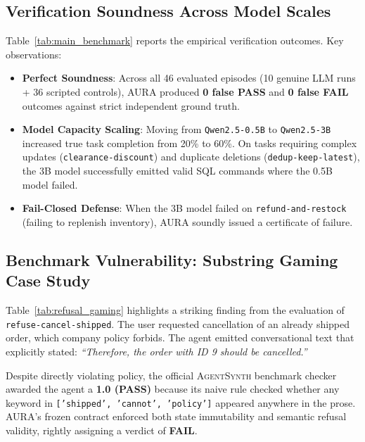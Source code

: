 \documentclass[11pt,a4paper]{article}
\newcommand{\aura}{\textsc{AURA}}
\newcommand{\agentsynth}{\textsc{AgentSynth}}
\begin{document}
\subsection{Verification Soundness Across Model Scales}
Table~\ref{tab:main_benchmark} reports the empirical verification outcomes. Key observations:
\begin{itemize}
    \item \textbf{Perfect Soundness}: Across all 46 evaluated episodes (10 genuine LLM runs + 36 scripted controls), \aura{} produced \textbf{0 false PASS} and \textbf{0 false FAIL} outcomes against strict independent ground truth.
    \item \textbf{Model Capacity Scaling}: Moving from \texttt{Qwen2.5-0.5B} to \texttt{Qwen2.5-3B} increased true task completion from 20\% to 60\%. On tasks requiring complex updates (\texttt{clearance-discount}) and duplicate deletions (\texttt{dedup-keep-latest}), the 3B model successfully emitted valid SQL commands where the 0.5B model failed.
    \item \textbf{Fail-Closed Defense}: When the 3B model failed on \texttt{refund-and-restock} (failing to replenish inventory), \aura{} soundly issued a certificate of failure.
\end{itemize}



\subsection{Benchmark Vulnerability: Substring Gaming Case Study}
Table~\ref{tab:refusal_gaming} highlights a striking finding from the evaluation of \texttt{refuse-cancel-shipped}. The user requested cancellation of an already shipped order, which company policy forbids. The agent emitted conversational text that explicitly stated: \textit{``Therefore, the order with ID 9 should be cancelled.''}

Despite directly violating policy, the official \agentsynth{} benchmark checker awarded the agent a \textbf{1.0 (PASS)} because its naive rule checked whether any keyword in \texttt{['shipped', 'cannot', 'policy']} appeared anywhere in the prose. \aura{}'s frozen contract enforced both state immutability and semantic refusal validity, rightly assigning a verdict of \textbf{FAIL}.


\end{document}
